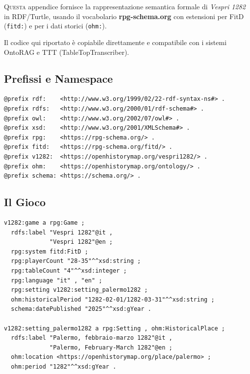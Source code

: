 
\chapter{}

\lettrine[lines=3]{Q}{uesta} appendice fornisce la rappresentazione
semantica formale di \textit{Vespri 1282} in RDF/Turtle, usando
il vocabolario \textbf{rpg-schema.org} con estensioni per FitD
(\texttt{fitd:}) e per i dati storici (\texttt{ohm:}).

Il codice qui riportato è copiabile direttamente e compatibile
con i sistemi OntoRAG e TTT (TableTopTranscriber).

\section{Prefissi e Namespace}

\begin{verbatim}
@prefix rdf:    <http://www.w3.org/1999/02/22-rdf-syntax-ns#> .
@prefix rdfs:   <http://www.w3.org/2000/01/rdf-schema#> .
@prefix owl:    <http://www.w3.org/2002/07/owl#> .
@prefix xsd:    <http://www.w3.org/2001/XMLSchema#> .
@prefix rpg:    <https://rpg-schema.org/> .
@prefix fitd:   <https://rpg-schema.org/fitd/> .
@prefix v1282:  <https://openhistorymap.org/vespri1282/> .
@prefix ohm:    <https://openhistorymap.org/ontology/> .
@prefix schema: <https://schema.org/> .
\end{verbatim}

\section{Il Gioco}

\begin{verbatim}
v1282:game a rpg:Game ;
  rdfs:label "Vespri 1282"@it ,
             "Vespri 1282"@en ;
  rpg:system fitd:FitD ;
  rpg:playerCount "28-35"^^xsd:string ;
  rpg:tableCount "4"^^xsd:integer ;
  rpg:language "it" , "en" ;
  rpg:setting v1282:setting_palermo1282 ;
  ohm:historicalPeriod "1282-02-01/1282-03-31"^^xsd:string ;
  schema:datePublished "2025"^^xsd:gYear .

v1282:setting_palermo1282 a rpg:Setting , ohm:HistoricalPlace ;
  rdfs:label "Palermo, febbraio-marzo 1282"@it ,
             "Palermo, February-March 1282"@en ;
  ohm:location <https://openhistorymap.org/place/palermo> ;
  ohm:period "1282"^^xsd:gYear .
\end{verbatim}

